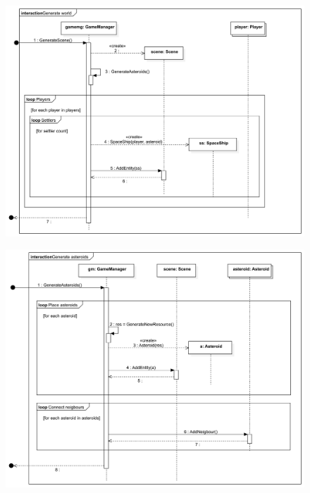 \begin{figure}[H] 
\centering 
\includegraphics[width=1\textwidth]{docs/3_Project/svg/Design Model!Game Init!Generate world!Generate world_26.png} 
\end{figure} 

\begin{figure}[H] 
\centering 
\includegraphics[width=1\textwidth]{docs/3_Project/svg/Design Model!Game Init!Generate asteroids!Generate asteroids_27.png} 
\end{figure} 

